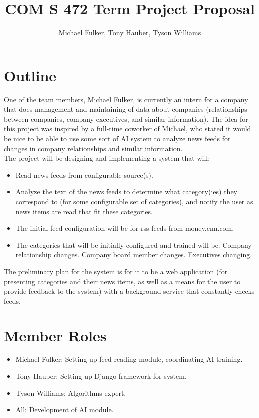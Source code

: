 \documentclass[12pt]{article}
\title{COM S 472 Term Project Proposal}
\author{Michael Fulker, Tony Hauber, Tyson Williams}
\begin{document}
\maketitle

\section{Outline}
One of the team members, Michael Fulker, is currently an intern for a company that does management and maintaining of data about companies (relationships between companies, company executives, and similar information). The idea for this project was inspired by a full-time coworker of Michael, who stated it would be nice to be able to use some sort of AI system to analyze news feeds for changes in company relationships and similar information.\\

The project will be designing and implementing a system that will:
\begin{itemize}
\item Read news feeds from configurable source(s).
 \item Analyze the text of the news feeds to determine what category(ies) they correspond to (for some configurable set of categories), and notify the user as news items are read that fit these categories.
 \item The initial feed configuration will be for rss feeds from money.cnn.com.
 \item The categories that will be initially configured and trained will be:
	\subitem Company relationship changes.
	\subitem Company board member changes.
	\subitem Executives changing.
\end{itemize}

The preliminary plan for the system is for it to be a web application (for presenting categories and their news items, as well as a means for the user to provide feedback to the system) with a background service that constantly checks feeds.

\section{Member Roles}
\begin{itemize}
 \item Michael Fulker: Setting up feed reading module, coordinating AI training.
 \item Tony Hauber: Setting up Django framework for system.
 \item Tyson Williams: Algorithms expert.
 \item All: Development of AI module.
\end{itemize}
\end{document}
